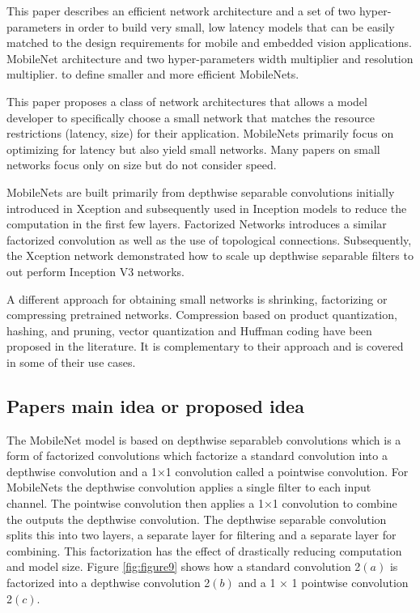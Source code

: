 \documentclass{ieeeaccess}
\begin{document}
This paper describes an efficient network architecture and a set of two hyper-parameters in order to build very small, low latency models that can be easily matched to the design requirements for mobile and embedded vision applications. MobileNet architecture and two hyper-parameters width multiplier and resolution multiplier.  to define smaller and more efficient MobileNets. 

This paper proposes a class of network architectures that allows a model developer to specifically choose a small network that matches the resource restrictions (latency, size) for their application. MobileNets primarily focus on optimizing for latency but also yield small networks. Many papers on small networks focus only on size but do not consider speed.

MobileNets are built primarily from depthwise separable convolutions initially introduced in Xception and subsequently used in Inception models to reduce the computation in the first few layers. Factorized Networks introduces a similar factorized convolution as well as the use of topological connections. Subsequently, the Xception network demonstrated how to scale up depthwise separable filters to out perform Inception V3 networks.

A different approach for obtaining small networks is shrinking, factorizing or compressing pretrained networks. Compression based on product quantization, hashing, and pruning, vector quantization and Huffman coding have been proposed in the literature. It is complementary to their approach and is covered in some of their use cases.

\subsection{Papers main idea or proposed idea}
The MobileNet model is based on depthwise separableb convolutions which is a form of factorized convolutions which factorize a standard convolution into a depthwise convolution and a 1×1 convolution called a pointwise convolution. For MobileNets the depthwise convolution applies a single filter to each input channel. The pointwise convolution then applies a 1×1 convolution to combine the outputs the depthwise convolution. The depthwise separable convolution splits this into two layers, a separate layer for filtering and a separate layer for combining. This factorization has the effect of drastically reducing computation and model size.  Figure \ref{fig:figure9} shows how a standard convolution 2$(a)$ is factorized into a depthwise convolution 2$(b)$ and a 1 × 1 pointwise convolution 2$(c)$.
\end{document}
